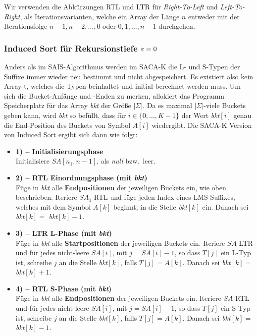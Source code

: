 Wir verwenden die Abkürzungen RTL und LTR für \textit{Right-To-Left} und \textit{Left-To-Right}, als Iterationsvarianten, welche ein Array der Länge $n$ entweder mit der Iterationsfolge $n-1, n-2, \ldots, 0$ oder $0, 1, \ldots, n - 1$ durchgehen. 

\subsubsection{ Induced Sort für Rekursionstiefe $\varepsilon = 0$}

Anders als im SAIS-Algorithmus werden im SACA-K die L- und S-Typen der Suffixe immer wieder neu bestimmt und nicht abgespeichert. Es existiert also kein Array t, welches die Typen beinhaltet und initial berechnet werden muss. Um sich die Bucket-Anfänge und -Enden zu merken, allokiert das Programm Speicherplatz für das Array \textit{bkt}  der Größe $|\Sigma|$. Da es maximal $|\Sigma|$-viele Buckets geben kann, wird \textit{bkt} so befüllt, dass für $i \in \{0, \ldots, K-1\}$ der Wert \textit{bkt}$[i]$ genau die End-Position des Buckets von Symbol $A[i]$ wiedergibt. Die SACA-K Version von Induced Sort ergibt sich dann wie folgt:
\begin{itemize}
\item \textbf{1) -- Initialisierungsphase} \\
Initialisiere $SA[n_1, n-1]$, als \textit{null} bzw.\ leer.

\item \textbf{2) -- RTL Einordnungsphase (mit \textit{bkt})} \\
Füge in \textit{bkt}  alle \textbf{Endpositionen} der jeweiligen Buckets ein, wie oben beschrieben. Iteriere $SA_1$ RTL und füge jeden Index eines LMS-Suffixes, welches mit dem Symbol $A[k]$ beginnt, in die Stelle \textit{bkt}$[k]$ ein. Danach sei \textit{bkt}$[k] = $ \textit{bkt}$[k]-1$.

\item \textbf{3) -- LTR L-Phase (mit \textit{bkt})} \\
Füge in \textit{bkt}  alle \textbf{Startpositionen} der jeweiligen Buckets ein. Iteriere $SA$ LTR und für jedes nicht-leere $SA[i]$, mit $j = SA[i]-1$, so dass $T[j]$ ein L-Typ ist, schreibe $j$ an die Stelle \textit{bkt}$[k]$, falls $T[j] = A[k]$. Danach sei \textit{bkt}$[k] = $ \textit{bkt}$[k]+1$.

\item \textbf{4) -- RTL S-Phase (mit \textit{bkt})} \\
Füge in \textit{bkt}  alle \textbf{Endpositionen} der jeweiligen Buckets ein. Iteriere $SA$ RTL und für jedes nicht-leere $SA[i]$, mit $j = SA[i]-1$, so dass $T[j]$ ein S-Typ ist, schreibe $j$ an die Stelle \textit{bkt}$[k]$, falls $T[j] = A[k]$. Danach sei \textit{bkt}$[k] = $ \textit{bkt}$[k]-1$.
\end{itemize}

